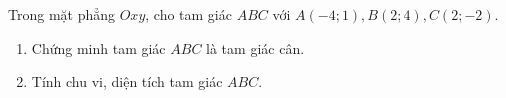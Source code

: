 \begin{bt}%
	Trong mặt phẳng $Oxy$, cho tam giác $ABC$ với $A\left(-4;1\right), B\left(2;4\right), C\left(2;-2\right)$. 
\begin{enumerate}
		\item Chứng minh tam giác $ABC$ là tam giác cân.
		\item Tính chu vi, diện tích tam giác $ABC$.

\end{enumerate}
\end{bt}

